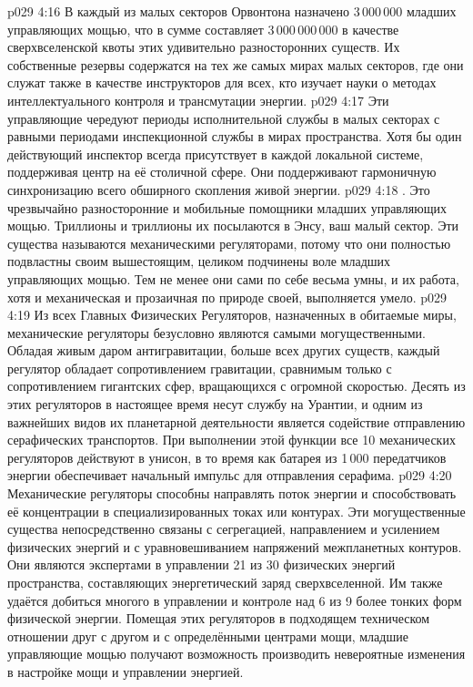 \vs p029 4:16 В каждый из малых секторов Орвонтона назначено 3\,000\,000 младших управляющих мощью, что в сумме составляет 3\,000\,000\,000 в качестве сверхвселенской квоты этих удивительно разносторонних существ. Их собственные резервы содержатся на тех же самых мирах малых секторов, где они служат также в качестве инструкторов для всех, кто изучает науки о методах интеллектуального контроля и трансмутации энергии.
\vs p029 4:17 Эти управляющие чередуют периоды исполнительной службы в малых секторах с равными периодами инспекционной службы в мирах пространства. Хотя бы один действующий инспектор всегда присутствует в каждой локальной системе, поддерживая центр на её столичной сфере. Они поддерживают гармоничную синхронизацию всего обширного скопления живой энергии.
\vs p029 4:18 . Это чрезвычайно разносторонние и мобильные помощники младших управляющих мощью. Триллионы и триллионы их посылаются в Энсу, ваш малый сектор. Эти существа называются механическими регуляторами, потому что они полностью подвластны своим вышестоящим, целиком подчинены воле младших управляющих мощью. Тем не менее они сами по себе весьма умны, и их работа, хотя и механическая и прозаичная по природе своей, выполняется умело.
\vs p029 4:19 Из всех Главных Физических Регуляторов, назначенных в обитаемые миры, механические регуляторы безусловно являются самыми могущественными. Обладая живым даром антигравитации, больше всех других существ, каждый регулятор обладает сопротивлением гравитации, сравнимым только с сопротивлением гигантских сфер, вращающихся с огромной скоростью. Десять из этих регуляторов в настоящее время несут службу на Урантии, и одним из важнейших видов их планетарной деятельности является содействие отправлению серафических транспортов. При выполнении этой функции все 10 механических регуляторов действуют в унисон, в то время как батарея из 1\,000 передатчиков энергии обеспечивает начальный импульс для отправления серафима.
\vs p029 4:20 Механические регуляторы способны направлять поток энергии и способствовать её концентрации в специализированных токах или контурах. Эти могущественные существа непосредственно связаны с сегрегацией, направлением и усилением физических энергий и с уравновешиванием напряжений межпланетных контуров. Они являются экспертами в управлении 21 из 30 физических энергий пространства, составляющих энергетический заряд сверхвселенной. Им также удаётся добиться многого в управлении и контроле над 6 из 9 более тонких форм физической энергии. Помещая этих регуляторов в подходящем техническом отношении друг с другом и с определёнными центрами мощи, младшие управляющие мощью получают возможность производить невероятные изменения в настройке мощи и управлении энергией.
